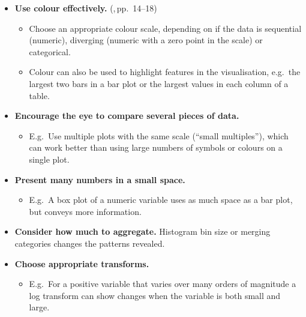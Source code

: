 \documentclass[10pt]{article}
\begin{document}
\begin{multicols}{3}
{\begin{itemize}[itemsep=1ex]
  clearer in graphics than tables. However, tables are a form of
  visualisation, and good for conveying raw data or dealing with large
  numbers of variables.
\item \textbf{Use colour effectively.} (\citealp{WexlEtal17big},\,pp.~14--18)
  \begin{itemize}
  \item Choose an appropriate colour scale, depending on if the data
    is sequential (numeric), diverging (numeric with a zero point in
    the scale) or categorical.
  \item Colour can also be used to highlight features in the visualisation,
    e.g.~the largest two bars in a bar plot or the largest values in
    each column of a table.
  \end{itemize}
\item \textbf{Encourage the eye to compare several pieces of data.}
  \begin{itemize}
  \item E.g.~Use multiple plots with the same scale (``small
    multiples''), which can work better than using large numbers of
    symbols or colours on a single plot.
  \end{itemize}
\item \textbf{Present many numbers in a small space.}
  \begin{itemize}
  \item E.g.~A box plot of a numeric variable uses as much space as a
    bar plot, but conveys more information.
  \end{itemize}
\item \textbf{Consider how much to aggregate.} Histogram bin size or
  merging categories changes the patterns revealed.
\item \textbf{Choose appropriate transforms.}
  \begin{itemize}
  \item E.g.~For a positive variable that varies over many orders of
    magnitude %
    a log transform can show changes when the variable is both small
    and large.
  \end{itemize}
\end{itemize}
}


\end{multicols}
\end{document}
